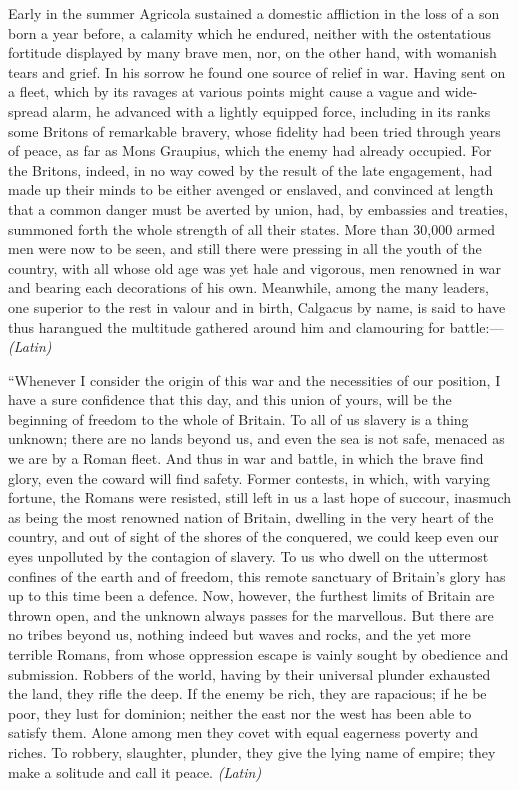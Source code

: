 Early in the summer Agricola sustained a domestic affliction in the loss of a son born a year before, a calamity which he endured, neither with the ostentatious fortitude displayed by many brave men, nor, on the other hand, with womanish tears and grief. In his sorrow he found one source of relief in war. Having sent on a fleet, which by its ravages at various points might cause a vague and wide-spread alarm, he advanced with a lightly equipped force, including in its ranks some Britons of remarkable bravery, whose fidelity had been tried through years of peace, as far as Mons Graupius, which the enemy had already occupied. For the Britons, indeed, in no way cowed by the result of the late engagement, had made up their minds to be either avenged or enslaved, and convinced at length that a common danger must be averted by union, had, by embassies and treaties, summoned forth the whole strength of all their states. More than 30,000 armed men were now to be seen, and still there were pressing in all the youth of the country, with all whose old age was yet hale and vigorous, men renowned in war and bearing each decorations of his own. Meanwhile, among the many leaders, one superior to the rest in valour and in birth, Calgacus by name, is said to have thus harangued the multitude gathered around him and clamouring for battle:— \emph{(Latin)}


``Whenever I consider the origin of this war and the necessities of our position, I have a sure confidence that this day, and this union of yours, will be the beginning of freedom to the whole of Britain. To all of us slavery is a thing unknown; there are no lands beyond us, and even the sea is not safe, menaced as we are by a Roman fleet. And thus in war and battle, in which the brave find glory, even the coward will find safety. Former contests, in which, with varying fortune, the Romans were resisted, still left in us a last hope of succour, inasmuch as being the most renowned nation of Britain, dwelling in the very heart of the country, and out of sight of the shores of the conquered, we could keep even our eyes unpolluted by the contagion of slavery. To us who dwell on the uttermost confines of the earth and of freedom, this remote sanctuary of Britain's glory has up to this time been a defence. Now, however, the furthest limits of Britain are thrown open, and the unknown always passes for the marvellous. But there are no tribes beyond us, nothing indeed but waves and rocks, and the yet more terrible Romans, from whose oppression escape is vainly sought by obedience and submission. Robbers of the world, having by their universal plunder exhausted the land, they rifle the deep. If the enemy be rich, they are rapacious; if he be poor, they lust for dominion; neither the east nor the west has been able to satisfy them. Alone among men they covet with equal eagerness poverty and riches. To robbery, slaughter, plunder, they give the lying name of empire; they make a solitude and call it peace. \emph{(Latin)}

